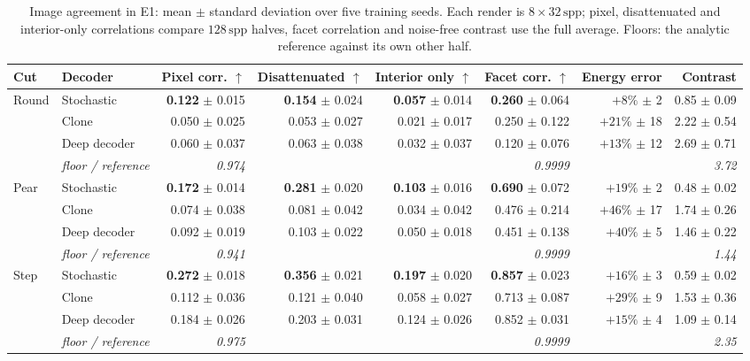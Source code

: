 \documentclass[conference]{IEEEtran}
\newcommand{\spp}{\,\mathrm{spp}}
\begin{document}
\begin{table}[t]
\caption{Image agreement in E1: mean $\pm$ standard deviation over five training
seeds. Each render is $8\times32\spp$; pixel, disattenuated and interior-only
correlations compare $128\spp$ halves, facet correlation and noise-free contrast
use the full average. Floors: the analytic reference against its own other half.}
\label{tab:images}
\centering\small
\begin{tabular}{@{}llrrrrrr@{}}
\toprule
Cut & Decoder & Pixel corr. $\uparrow$ & Disattenuated $\uparrow$ & Interior only $\uparrow$ & Facet corr. $\uparrow$ & Energy error & Contrast \\
\midrule
Round & Stochastic & \textbf{0.122} $\pm$ 0.015 & \textbf{0.154} $\pm$ 0.024 & \textbf{0.057} $\pm$ 0.014 & \textbf{0.260} $\pm$ 0.064 & $+8\%$ $\pm$ 2 & 0.85 $\pm$ 0.09 \\
 & Clone & 0.050 $\pm$ 0.025 & 0.053 $\pm$ 0.027 & 0.021 $\pm$ 0.017 & 0.250 $\pm$ 0.122 & $+21\%$ $\pm$ 18 & 2.22 $\pm$ 0.54 \\
 & Deep decoder & 0.060 $\pm$ 0.037 & 0.063 $\pm$ 0.038 & 0.032 $\pm$ 0.037 & 0.120 $\pm$ 0.076 & $+13\%$ $\pm$ 12 & 2.69 $\pm$ 0.71 \\
 & \emph{floor / reference} & \emph{0.974} & & & \emph{0.9999} & & \emph{3.72} \\
\midrule
Pear & Stochastic & \textbf{0.172} $\pm$ 0.014 & \textbf{0.281} $\pm$ 0.020 & \textbf{0.103} $\pm$ 0.016 & \textbf{0.690} $\pm$ 0.072 & $+19\%$ $\pm$ 2 & 0.48 $\pm$ 0.02 \\
 & Clone & 0.074 $\pm$ 0.038 & 0.081 $\pm$ 0.042 & 0.034 $\pm$ 0.042 & 0.476 $\pm$ 0.214 & $+46\%$ $\pm$ 17 & 1.74 $\pm$ 0.26 \\
 & Deep decoder & 0.092 $\pm$ 0.019 & 0.103 $\pm$ 0.022 & 0.050 $\pm$ 0.018 & 0.451 $\pm$ 0.138 & $+40\%$ $\pm$ 5 & 1.46 $\pm$ 0.22 \\
 & \emph{floor / reference} & \emph{0.941} & & & \emph{0.9999} & & \emph{1.44} \\
\midrule
Step & Stochastic & \textbf{0.272} $\pm$ 0.018 & \textbf{0.356} $\pm$ 0.021 & \textbf{0.197} $\pm$ 0.020 & \textbf{0.857} $\pm$ 0.023 & $+16\%$ $\pm$ 3 & 0.59 $\pm$ 0.02 \\
 & Clone & 0.112 $\pm$ 0.036 & 0.121 $\pm$ 0.040 & 0.058 $\pm$ 0.027 & 0.713 $\pm$ 0.087 & $+29\%$ $\pm$ 9 & 1.53 $\pm$ 0.36 \\
 & Deep decoder & 0.184 $\pm$ 0.026 & 0.203 $\pm$ 0.031 & 0.124 $\pm$ 0.026 & 0.852 $\pm$ 0.031 & $+15\%$ $\pm$ 4 & 1.09 $\pm$ 0.14 \\
 & \emph{floor / reference} & \emph{0.975} & & & \emph{0.9999} & & \emph{2.35} \\
\bottomrule
\end{tabular}
\end{table}
\end{document}
